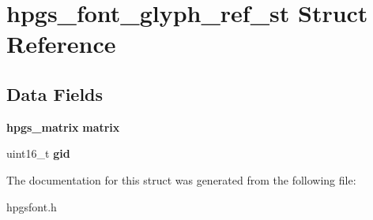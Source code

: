 \section{hpgs\_\-font\_\-glyph\_\-ref\_\-st Struct Reference}
\label{structhpgs__font__glyph__ref__st}
\subsection*{Data Fields}
\begin{DoxyCompactItemize}
\item 
{\bf hpgs\_\-matrix} {\bfseries matrix}\label{structhpgs__font__glyph__ref__st_a4351a9d1a5be53232858efb015dcefcb}

\item 
uint16\_\-t {\bfseries gid}\label{structhpgs__font__glyph__ref__st_a981f142ce95abdf957d1c9e9ae5b9883}

\end{DoxyCompactItemize}


The documentation for this struct was generated from the following file:\begin{DoxyCompactItemize}
\item 
hpgsfont.h\end{DoxyCompactItemize}
